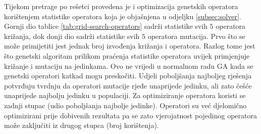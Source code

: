 \documentclass[times, utf8, diplomski]{fer}
\begin{document}
Tijekom pretrage po rešetci provedena je i optimizacija genetskih operatora korištenjem statistike operatora koja je objašnjena u odjeljku \ref{subsec:solver}. Gornji dio tablice \ref{tab:grid-search-operators} sadrži statistike svih $5$ operatora križanja, dok donji dio sadrži statistike svih $5$ operatora mutacija. Prvo što se može primijetiti jest jednak broj izvođenja križanja i operatora. Razlog tome jest što genetski algoritam prilikom praćenja statistike operatora uvijek primjenjuje križanje i mutaciju na jedinkama. Ovo ne vrijedi u normalnom radu GA kada se genetski operatori katkad mogu preskočiti. Udjeli poboljšanja najboljeg rješenja potvrđuju tvrdnju da operatori mutacije rjeđe unaprijede jedinku, ali zato češće unaprijede najbolju jedinku u populaciji. Za optimiziranje operatora koristi se zadnji stupac (udio poboljšanja najbolje jedinke). Operatori su već djelomično optimizirani prije dobivenih rezultata pa se zato vjerojatnost pojedinog operatora može zaključiti iz drugog stupca (broj korištenja).
\end{document}
